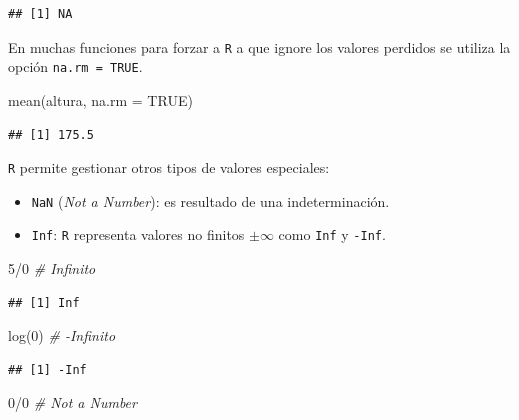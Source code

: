 \documentclass[
]{book}
\newenvironment{Shaded}{\begin{snugshade}}{\end{snugshade}}
\newcommand{\AttributeTok}[1]{\textcolor[rgb]{0.77,0.63,0.00}{#1}}
\newcommand{\CommentTok}[1]{\textcolor[rgb]{0.56,0.35,0.01}{\textit{#1}}}
\newcommand{\ConstantTok}[1]{\textcolor[rgb]{0.00,0.00,0.00}{#1}}
\newcommand{\DecValTok}[1]{\textcolor[rgb]{0.00,0.00,0.81}{#1}}
\newcommand{\FunctionTok}[1]{\textcolor[rgb]{0.00,0.00,0.00}{#1}}
\newcommand{\NormalTok}[1]{#1}
\newcommand{\SpecialCharTok}[1]{\textcolor[rgb]{0.00,0.00,0.00}{#1}}
\theoremstyle{break}
\theoremstyle{nonumberplain}
\begin{document}
\begin{verbatim}
## [1] NA
\end{verbatim}

En muchas funciones para forzar a \texttt{R} a que ignore los valores perdidos se utiliza la opción \texttt{na.rm\ =\ TRUE}.

\begin{Shaded}
\begin{Highlighting}[]
\FunctionTok{mean}\NormalTok{(altura, }\AttributeTok{na.rm =} \ConstantTok{TRUE}\NormalTok{)}
\end{Highlighting}
\end{Shaded}

\begin{verbatim}
## [1] 175.5
\end{verbatim}

\texttt{R} permite gestionar otros tipos de valores especiales:

\begin{itemize}
\item
  \texttt{NaN} (\emph{Not a Number}): es resultado de una indeterminación.
\item
  \texttt{Inf}: \texttt{R} representa valores no finitos \(\pm \infty\) como \texttt{Inf} y \texttt{-Inf}.
\end{itemize}

\vspace*{0.3cm}

\begin{Shaded}
\begin{Highlighting}[]
\DecValTok{5}\SpecialCharTok{/}\DecValTok{0}  \CommentTok{\# Infinito}
\end{Highlighting}
\end{Shaded}

\begin{verbatim}
## [1] Inf
\end{verbatim}

\begin{Shaded}
\begin{Highlighting}[]
\FunctionTok{log}\NormalTok{(}\DecValTok{0}\NormalTok{)  }\CommentTok{\# {-}Infinito}
\end{Highlighting}
\end{Shaded}

\begin{verbatim}
## [1] -Inf
\end{verbatim}

\begin{Shaded}
\begin{Highlighting}[]
\DecValTok{0}\SpecialCharTok{/}\DecValTok{0}  \CommentTok{\# Not a Number}
\end{Highlighting}
\end{Shaded}
\end{document}
